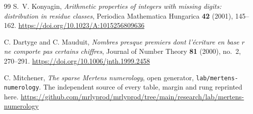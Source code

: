 \documentclass[11pt]{amsart}
\theoremstyle{definition}
\theoremstyle{remark}
\begin{document}
\begin{thebibliography}{99}
S.~V. Konyagin, \emph{Arithmetic properties of integers with missing digits: distribution in residue classes}, Periodica Mathematica Hungarica \textbf{42} (2001), 145--162. \url{https://doi.org/10.1023/A:1015256809636}

C. Dartyge and C. Mauduit, \emph{Nombres presque premiers dont l'\'ecriture en base $r$ ne comporte pas certains chiffres}, Journal of Number Theory \textbf{81} (2000), no.~2, 270--291. \url{https://doi.org/10.1006/jnth.1999.2458}

C. Mitchener, \emph{The sparse Mertens numerology}, open generator, \texttt{lab/mertens-numerology}. The independent source of every table, margin and rung reprinted here. \url{https://github.com/mrlyprod/mrlyprod/tree/main/research/lab/mertens-numerology}

\end{thebibliography}
\end{document}
